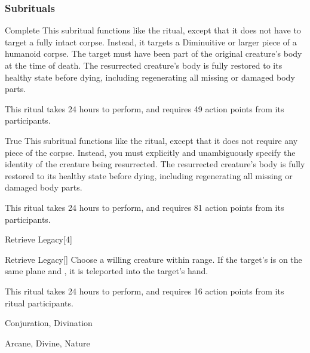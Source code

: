 \subsubsection{Subrituals}


\begin{ability}[\nth{7}]{Complete}
This subritual functions like the  ritual, except that it does not have to target a fully intact corpse.
Instead, it targets a Diminuitive or larger piece of a humanoid corpse.
The target must have been part of the original creature's body at the time of death.
The resurrected creature's body is fully restored to its healthy state before dying, including regenerating all missing or damaged body parts.

This ritual takes 24 hours to perform, and requires 49 action points from its participants.
\end{ability}
\vspace{0.25em}


\begin{ability}[\nth{9}]{True}
This subritual functions like the  ritual, except that it does not require any piece of the corpse.
Instead, you must explicitly and unambiguously specify the identity of the creature being resurrected.
The resurrected creature's body is fully restored to its healthy state before dying, including regenerating all missing or damaged body parts.

This ritual takes 24 hours to perform, and requires 81 action points from its participants.
\end{ability}
\vspace{0.25em}


\begin{spellsection}{Retrieve Legacy}[4]


\begin{ability}{Retrieve Legacy}[]
Choose a willing creature within \rngclose range.
If the target's  is on the same plane and , it is teleported into the target's hand.

This ritual takes 24 hours to perform, and requires 16 action points from its ritual participants.
\end{ability}




 Conjuration, Divination

 Arcane, Divine, Nature
\end{spellsection}


